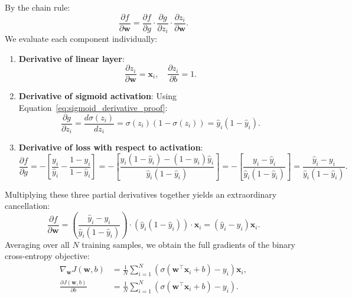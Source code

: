 By the chain rule:
\begin{equation}
\frac{\partial f}{\partial \mathbf{w}} = \frac{\partial f}{\partial g} \cdot \frac{\partial g}{\partial z_i} \cdot \frac{\partial z_i}{\partial \mathbf{w}}.
\label{eq:chain_rule_decomposition}
\end{equation}
We evaluate each component individually:
\begin{enumerate}
  \item \textbf{Derivative of linear layer}:
    \begin{equation}
    \frac{\partial z_i}{\partial \mathbf{w}} = \mathbf{x}_i, \quad \frac{\partial z_i}{\partial b} = 1.
    \end{equation}
  \item \textbf{Derivative of sigmoid activation}:
    Using Equation~\eqref{eq:sigmoid_derivative_proof}:
    \begin{equation}
    \frac{\partial g}{\partial z_i} = \frac{d\sigma(z_i)}{dz_i} = \sigma(z_i)(1 - \sigma(z_i)) = \hat{y}_i(1 - \hat{y}_i).
    \end{equation}
  \item \textbf{Derivative of loss with respect to activation}:
    \begin{equation}
    \frac{\partial f}{\partial g} = -\left[ \frac{y_i}{\hat{y}_i} - \frac{1 - y_i}{1 - \hat{y}_i} \right] = -\left[ \frac{y_i(1 - \hat{y}_i) - (1 - y_i)\hat{y}_i}{\hat{y}_i(1 - \hat{y}_i)} \right] = -\left[ \frac{y_i - \hat{y}_i}{\hat{y}_i(1 - \hat{y}_i)} \right] = \frac{\hat{y}_i - y_i}{\hat{y}_i(1 - \hat{y}_i)}.
    \end{equation}
\end{enumerate}

Multiplying these three partial derivatives together yields an extraordinary cancellation:
\begin{equation}
\frac{\partial f}{\partial \mathbf{w}} = \left( \frac{\hat{y}_i - y_i}{\hat{y}_i(1 - \hat{y}_i)} \right) \cdot \left( \hat{y}_i(1 - \hat{y}_i) \right) \cdot \mathbf{x}_i = (\hat{y}_i - y_i) \mathbf{x}_i.
\label{eq:bce_single_sample_gradient}
\end{equation}
Averaging over all $N$ training samples, we obtain the full gradients of the binary cross-entropy objective:
\begin{align}
\nabla_{\mathbf{w}} J(\mathbf{w}, b) &= \frac{1}{N} \sum_{i=1}^N \left( \sigma(\mathbf{w}^\top \mathbf{x}_i + b) - y_i \right) \mathbf{x}_i, \label{eq:bce_gradient_w} \\
\frac{\partial J(\mathbf{w}, b)}{\partial b} &= \frac{1}{N} \sum_{i=1}^N \left( \sigma(\mathbf{w}^\top \mathbf{x}_i + b) - y_i \right). \label{eq:bce_gradient_b}
\end{align}

